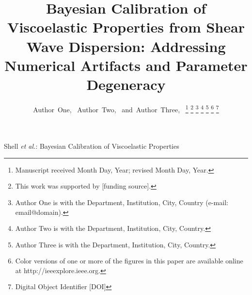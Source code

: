 \documentclass[journal]{IEEEtran}
\begin{document}
%
\title{Bayesian Calibration of Viscoelastic Properties from Shear Wave Dispersion: Addressing Numerical Artifacts and Parameter Degeneracy}
%
\author{Author~One,~
        Author~Two,~
        and~Author~Three,~%
\thanks{Manuscript received Month Day, Year; revised Month Day, Year.}
\thanks{This work was supported by [funding source].}
\thanks{Author One is with the Department, Institution, City, Country (e-mail: email@domain).}
\thanks{Author Two is with the Department, Institution, City, Country.}
\thanks{Author Three is with the Department, Institution, City, Country.}
\thanks{Color versions of one or more of the figures in this paper are available online at http://ieeexplore.ieee.org.}
\thanks{Digital Object Identifier [DOI]}}

%
{Shell \MakeLowercase{\textit{et al.}}: Bayesian Calibration of Viscoelastic Properties}

\maketitle
\end{document}
